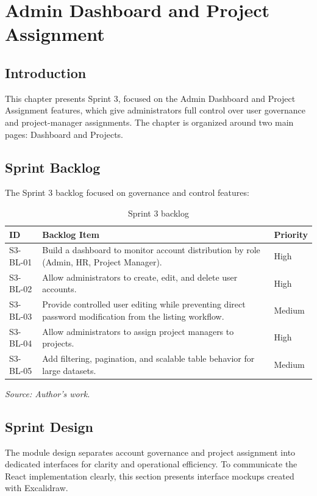 \chapter{Admin Dashboard and Project Assignment}
\minitoc
\clearpage
\section{Introduction}
This chapter presents Sprint 3, focused on the Admin Dashboard and Project Assignment features, which give administrators full control over user governance and project-manager assignments. The chapter is organized around two main pages: Dashboard and Projects.

\section{Sprint Backlog}
The Sprint 3 backlog focused on governance and control features:
\begin{table}[H]
\centering
\renewcommand{\arraystretch}{1.2}
\begin{tabular}{|l|>{\raggedright\arraybackslash}p{9.5cm}|l|}
\hline
\textbf{ID} & \textbf{Backlog Item} & \textbf{Priority} \\
\hline
S3-BL-01 & Build a dashboard to monitor account distribution by role (Admin, HR, Project Manager). & High \\
\hline
S3-BL-02 & Allow administrators to create, edit, and delete user accounts. & High \\
\hline
S3-BL-03 & Provide controlled user editing while preventing direct password modification from the listing workflow. & Medium \\
\hline
S3-BL-04 & Allow administrators to assign project managers to projects. & High \\
\hline
S3-BL-05 & Add filtering, pagination, and scalable table behavior for large datasets. & Medium \\
\hline
\end{tabular}
\caption{Sprint 3 backlog}
\label{tab:sprint-3-backlog}
{\footnotesize\textit{Source: Author's work.}}
\end{table}

\section{Sprint Design}
The module design separates account governance and project assignment into dedicated interfaces for clarity and operational efficiency.
To communicate the React implementation clearly, this section presents interface mockups created with Excalidraw.

